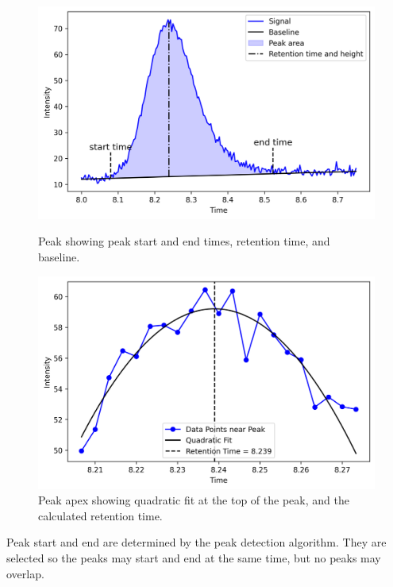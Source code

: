 \documentclass{article}
\begin{document}
\begin{figure}[t]
    \centering
    \begin{minipage}[t]{0.45\textwidth}
        \centering
        \includegraphics[width=\textwidth]{baseline_and_retention_time.png} %
        \caption{Peak showing peak start and end times, retention time, and baseline.}\label{fig:times}
        \vfill
    \end{minipage}\hfill 
    \begin{minipage}[t]{0.45\textwidth}
        \centering
        \includegraphics[width=\textwidth]{quadratic_fit.png} %
        \caption{Peak apex showing quadratic fit at the top of the peak, and the calculated retention time.}\label{fig:quad-fit}
    \end{minipage}
\end{figure}

Peak start and end are determined by the peak detection algorithm. They are selected so the peaks may start and end at the same time, but no peaks may overlap. 
\end{document}
